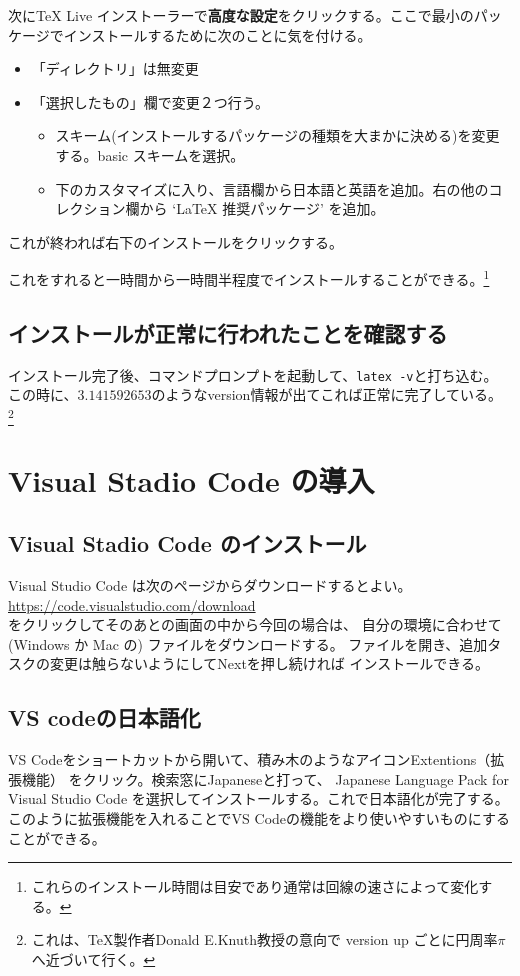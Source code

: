 \documentclass[titlepage]{ltjsarticle}
\begin{document}
次にTeX Live インストーラーで\textbf{高度な設定}をクリックする。ここで最小のパッケージでインストールするために次のことに気を付ける。
\begin{itemize}
  \item 「ディレクトリ」は無変更
  \item 「選択したもの」欄で変更２つ行う。
  \begin{itemize}
    \item スキーム(インストールするパッケージの種類を大まかに決める)を変更する。basic スキームを選択。
    \item 下のカスタマイズに入り、言語欄から日本語と英語を追加。右の他のコレクション欄から `LaTeX 推奨パッケージ' を追加。
  \end{itemize}
\end{itemize}
これが終われば右下のインストールをクリックする。

これをすれると一時間から一時間半程度でインストールすることができる。\footnote{これらのインストール時間は目安であり通常は回線の速さによって変化する。}

\subsection{インストールが正常に行われたことを確認する}
インストール完了後、コマンドプロンプトを起動して、\verb|latex -v|と打ち込む。
この時に、$3.141592653$のようなversion情報が出てこれば正常に完了している。
\footnote{
  これは、\TeX 製作者Donald E.Knuth教授の意向で
  version up ごとに円周率$\pi$へ近づいて行く。
}

\section{Visual Stadio Code の導入}
\subsection{Visual Stadio Code のインストール}
Visual Studio Code は次のページからダウンロードするとよい。\\
\url{https://code.visualstudio.com/download}\\
をクリックしてそのあとの画面の中から今回の場合は、
自分の環境に合わせて (Windows か Mac の) ファイルをダウンロードする。
ファイルを開き、追加タスクの変更は触らないようにしてNextを押し続ければ
インストールできる。
\subsection{VS codeの日本語化}
VS Codeをショートカットから開いて、積み木のようなアイコンExtentions（拡張機能）
をクリック。検索窓にJapaneseと打って、
Japanese Language Pack for Visual Studio Code
を選択してインストールする。これで日本語化が完了する。
このように拡張機能を入れることでVS Codeの機能をより使いやすいものにすることができる。
\end{document}
